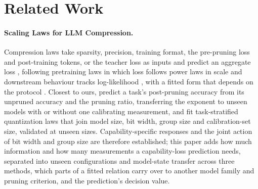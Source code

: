 \section{Related Work}
\label{sec:related}

\paragraph{Scaling Laws for LLM Compression.}
Compression laws take sparsity, precision, training format, the pre-pruning loss and post-training
tokens, or the teacher loss as inputs and predict an aggregate loss
\citep{frantar2023scaling,kumar2024scaling,panferov2025unified,zhang2024scaling,busbridge2025distillation},
following pretraining laws in which loss follows power laws in scale and downstream behaviour tracks
log-likelihood
\citep{hestness2017deep,kaplan2020scaling,hoffmann2022training,schaeffer2023emergent,gadre2024language,bhagia2024establishing,lourie2025scaling},
with a fitted form that depends on the protocol \citep{li2025misfitting,besiroglu2024chinchilla}.
Closest to ours, \citet{sengupta2025compression} predict a task's post-pruning accuracy from its unpruned accuracy and the pruning ratio, transferring the exponent to unseen models with or without one calibrating measurement, and \citet{zhou2026task} fit task-stratified quantization laws that join model size, bit width, group size and calibration-set size, validated at unseen sizes. Capability-specific responses and the joint action of bit width and group size are therefore established; this paper adds how much information and how many measurements a capability-loss prediction needs, separated into unseen configurations and model-state transfer across three methods, which parts of a fitted relation carry over to another model family and pruning criterion, and the prediction's decision value.

